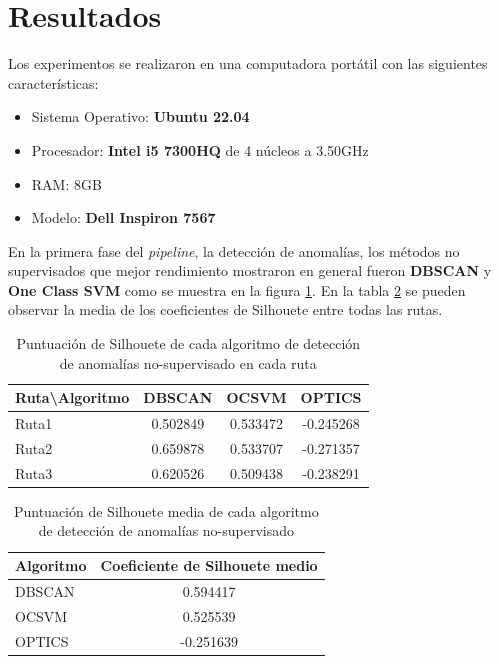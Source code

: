 \section{Resultados}

	Los experimentos se realizaron en una computadora portátil con las siguientes características:

	\begin{itemize}
		\item Sistema Operativo: \textbf{Ubuntu 22.04}
		\item Procesador: \textbf{Intel i5 7300HQ} de 4 núcleos a 3.50GHz
		\item RAM: 8GB
		\item Modelo: \textbf{Dell Inspiron 7567}
	\end{itemize}

	En la primera fase del \emph{pipeline}, la detección de anomalías, los métodos no supervisados que mejor rendimiento mostraron en general fueron
	\textbf{DBSCAN} y \textbf{One Class SVM} como se muestra en la figura \ref{table:1}. En la tabla \ref{table:2} se pueden observar la media
	de los coeficientes de Silhouete entre todas las rutas.

	\begin{table}[htb]
		\centering
		\caption{Puntuación de Silhouete de cada algoritmo de detección de anomalías no-supervisado en cada ruta}
		\label{table:1}
		\begin{tabular}{lccc}
		\toprule
		  Ruta\textbackslash Algoritmo &    DBSCAN &     OCSVM &     OPTICS \\
		\midrule
		  Ruta1 &  0.502849 &  0.533472 &  -0.245268 \\
		  Ruta2 &  0.659878 &  0.533707 &  -0.271357 \\
		  Ruta3 &  0.620526 &  0.509438 &  -0.238291 \\
		\bottomrule
		\end{tabular}
		
	\end{table}

	\begin{table}[htb]
		\centering
		\caption{Puntuación de Silhouete media de cada algoritmo de detección de anomalías no-supervisado}
		\label{table:2}
		\begin{tabular}{lc}
		\toprule
		Algoritmo & Coeficiente de Silhouete medio \\
		\midrule
		   DBSCAN &   0.594417 	\\
		    OCSVM &   0.525539 	\\
		   OPTICS &  -0.251639 	\\
		\bottomrule
		\end{tabular}
		
	\end{table}

